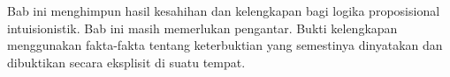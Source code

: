 \documentclass[../../../include/open-logic-chapter]{subfiles}
\begin{document}

\begin{editorial}
  Bab ini menghimpun hasil kesahihan dan kelengkapan bagi logika
  proposisional intuisionistik. Bab ini masih memerlukan pengantar. Bukti
  kelengkapan menggunakan fakta-fakta tentang keterbuktian yang semestinya
  dinyatakan dan dibuktikan secara eksplisit di suatu tempat.
\end{editorial}


\OLEndChapterHook
\end{document}
